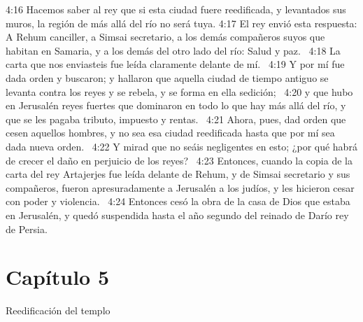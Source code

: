 4:16 Hacemos saber al rey que si esta ciudad fuere reedificada, y levantados sus muros, la región de más allá del río no será tuya. 
4:17 El rey envió esta respuesta: A Rehum canciller, a Simsai secretario, a los demás compañeros suyos que habitan en Samaria, y a los demás del otro lado del río: Salud y paz.  
4:18 La carta que nos enviasteis fue leída claramente delante de mí.  
4:19 Y por mí fue dada orden y buscaron; y hallaron que aquella ciudad de tiempo antiguo se levanta contra los reyes y se rebela, y se forma en ella sedición;  
4:20 y que hubo en Jerusalén reyes fuertes que dominaron en todo lo que hay más allá del río, y que se les pagaba tributo, impuesto y rentas.  
4:21 Ahora, pues, dad orden que cesen aquellos hombres, y no sea esa ciudad reedificada hasta que por mí sea dada nueva orden.  
4:22 Y mirad que no seáis negligentes en esto; ¿por qué habrá de crecer el daño en perjuicio de los reyes?  
4:23 Entonces, cuando la copia de la carta del rey Artajerjes fue leída delante de Rehum, y de Simsai secretario y sus compañeros, fueron apresuradamente a Jerusalén a los judíos, y les hicieron cesar con poder y violencia.  
4:24 Entonces cesó la obra de la casa de Dios que estaba en Jerusalén, y quedó suspendida hasta el año segundo del reinado de Darío rey de Persia.  
\section*{Capítulo 5 }
Reedificación del templo  

